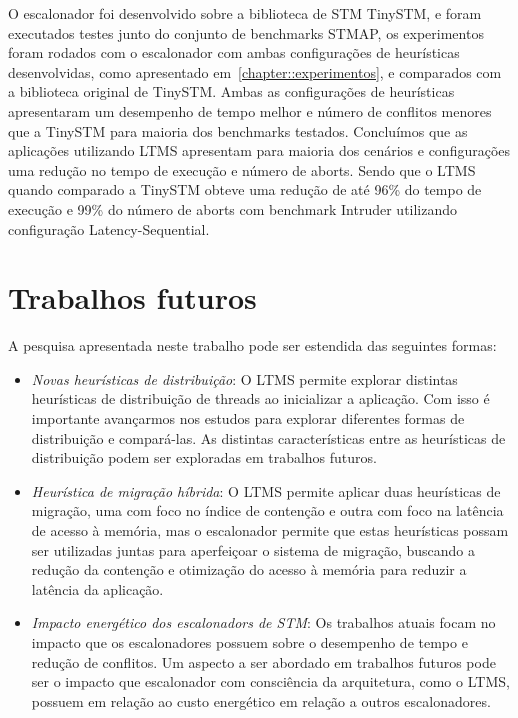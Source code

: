 \documentclass[diss,capa]{texufpel}
\begin{document}
O escalonador foi desenvolvido sobre a biblioteca de STM TinySTM, e foram executados testes junto do conjunto de benchmarks STMAP, os experimentos foram rodados com o escalonador com ambas configurações de heurísticas desenvolvidas, como apresentado em~\ref{chapter::experimentos}, e comparados com a biblioteca original de TinySTM. Ambas as configurações de heurísticas apresentaram um desempenho de tempo melhor e número de conflitos menores que a TinySTM para maioria dos benchmarks testados. Concluímos que as aplicações utilizando LTMS apresentam para maioria dos cenários e configurações uma redução no tempo de execução e número de aborts. Sendo que o LTMS quando comparado a TinySTM obteve uma redução de até 96\% do tempo de execução e 99\% do número de aborts com benchmark Intruder utilizando configuração Latency-Sequential.

\section{\textbf{Trabalhos futuros}}

A pesquisa apresentada neste trabalho pode ser estendida das seguintes formas:

\begin{itemize}
 \item \emph{Novas heurísticas de distribuição}: O LTMS permite explorar distintas heurísticas de distribuição de threads ao inicializar a aplicação. Com isso é importante avançarmos nos estudos para explorar diferentes formas de distribuição e compará-las. As distintas características entre as heurísticas de distribuição podem ser exploradas em trabalhos futuros. 

 \item \emph{Heurística de migração híbrida}: O LTMS permite aplicar duas heurísticas de migração, uma com foco no índice de contenção e outra com foco na latência de acesso à memória, mas o escalonador permite que estas heurísticas possam ser utilizadas juntas para aperfeiçoar o sistema de migração, buscando a redução da contenção e otimização do acesso à memória para reduzir a latência da aplicação.

 \item \emph{Impacto energético dos escalonadors de STM}: Os trabalhos atuais focam no impacto que os escalonadores possuem sobre o desempenho de tempo e redução de conflitos. Um aspecto a ser abordado em trabalhos futuros pode ser o impacto que escalonador com consciência da arquitetura, como o LTMS, possuem em relação ao custo energético em relação a outros escalonadores.
\end{itemize}
\end{document}
